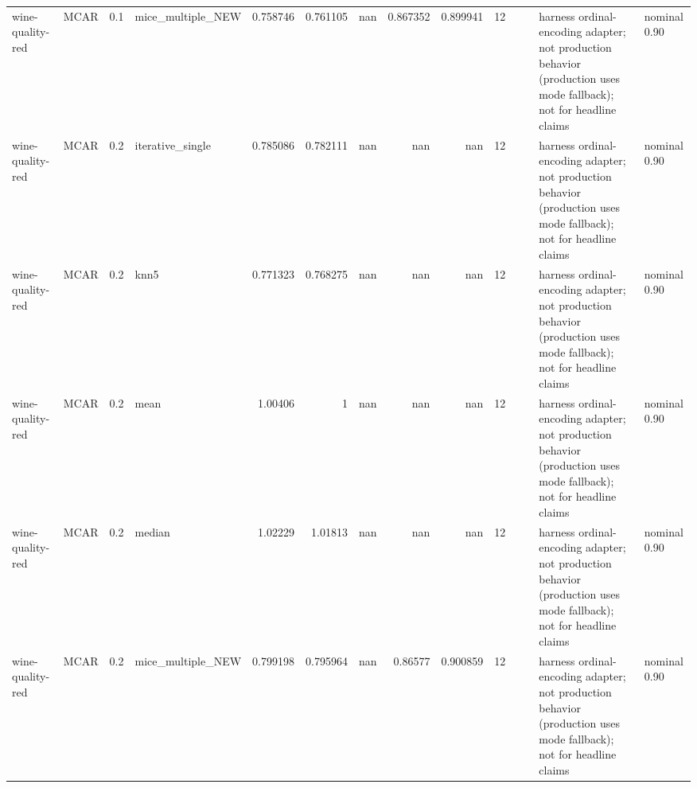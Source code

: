 \begin{table}[ht]
\begin{tabular}{llrlrrrrrrllll}
 wine-quality-red     & MCAR        &         0.1 & mice\_multiple\_NEW &       0.758746 &             0.761105 &               nan        &                       0.867352 &                         0.899941 &        12 &                    &                                         & harness ordinal-encoding adapter; not production behavior (production uses mode fallback); not for headline claims & nominal 0.90              \\
 wine-quality-red     & MCAR        &         0.2 & iterative\_single  &       0.785086 &             0.782111 &               nan        &                     nan        &                       nan        &        12 &                    &                                         & harness ordinal-encoding adapter; not production behavior (production uses mode fallback); not for headline claims & nominal 0.90              \\
 wine-quality-red     & MCAR        &         0.2 & knn5              &       0.771323 &             0.768275 &               nan        &                     nan        &                       nan        &        12 &                    &                                         & harness ordinal-encoding adapter; not production behavior (production uses mode fallback); not for headline claims & nominal 0.90              \\
 wine-quality-red     & MCAR        &         0.2 & mean              &       1.00406  &             1        &               nan        &                     nan        &                       nan        &        12 &                    &                                         & harness ordinal-encoding adapter; not production behavior (production uses mode fallback); not for headline claims & nominal 0.90              \\
 wine-quality-red     & MCAR        &         0.2 & median            &       1.02229  &             1.01813  &               nan        &                     nan        &                       nan        &        12 &                    &                                         & harness ordinal-encoding adapter; not production behavior (production uses mode fallback); not for headline claims & nominal 0.90              \\
 wine-quality-red     & MCAR        &         0.2 & mice\_multiple\_NEW &       0.799198 &             0.795964 &               nan        &                       0.86577  &                         0.900859 &        12 &                    &                                         & harness ordinal-encoding adapter; not production behavior (production uses mode fallback); not for headline claims & nominal 0.90              \\

\end{tabular}
\end{table}
